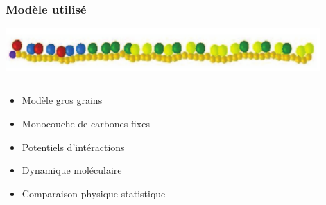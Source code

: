 \documentclass{beamer}
\begin{document}
 \frame %
{
  \frametitle{Modèle utilisé}
   \begin{center}

\includegraphics[width=0.9\textwidth]{screenmodel.png}

\medskip

\begin{columns}
 \begin{column}{0.6\textwidth}
\begin{itemize}
\item<2->{Modèle gros grains}
\medskip
\item<3->{Monocouche de carbones fixes}
\medskip
\item<4->{Potentiels d’intéractions}
\medskip
\medskip
\medskip
\medskip
\item<5->{Dynamique moléculaire}
\medskip
\item<6->{Comparaison physique statistique}


\end{itemize}
\end{column}
\begin{column}{0.4\textwidth}

\end{column}
\end{columns}
\end{center}

}
\end{document}
